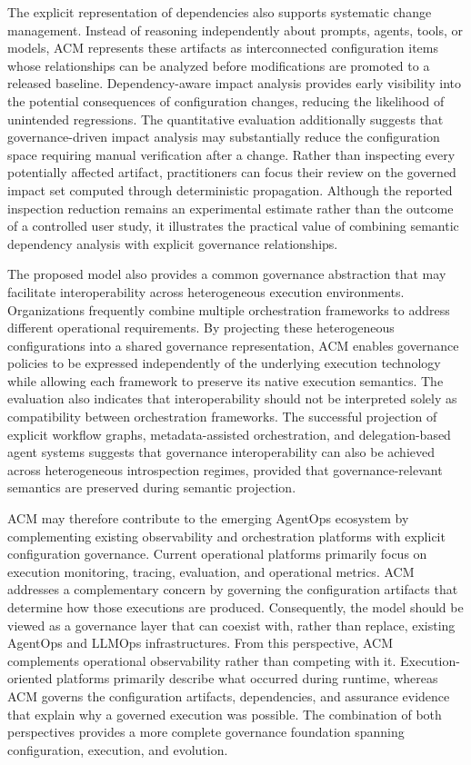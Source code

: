 \documentclass[10pt]{article}
\begin{document}
The explicit representation of dependencies also supports systematic change management. Instead of reasoning independently about prompts, agents, tools, or models, ACM represents these artifacts as interconnected configuration items whose relationships can be analyzed before modifications are promoted to a released baseline. Dependency-aware impact analysis provides early visibility into the potential consequences of configuration changes, reducing the likelihood of unintended regressions. The quantitative evaluation additionally suggests that governance-driven impact analysis may substantially reduce the configuration space requiring manual verification after a change. Rather than inspecting every potentially affected artifact, practitioners can focus their review on the governed impact set computed through deterministic propagation. Although the reported inspection reduction remains an experimental estimate rather than the outcome of a controlled user study, it illustrates the practical value of combining semantic dependency analysis with explicit governance relationships.


The proposed model also provides a common governance abstraction that may facilitate interoperability across heterogeneous execution environments. Organizations frequently combine multiple orchestration frameworks to address different operational requirements. By projecting these heterogeneous configurations into a shared governance representation, ACM enables governance policies to be expressed independently of the underlying execution technology while allowing each framework to preserve its native execution semantics. 
The evaluation also indicates that interoperability should not be interpreted solely as compatibility between orchestration frameworks. The successful projection of explicit workflow graphs, metadata-assisted orchestration, and delegation-based agent systems suggests that governance interoperability can also be achieved across heterogeneous introspection regimes, provided that governance-relevant semantics are preserved during semantic projection.

ACM may therefore contribute to the emerging AgentOps ecosystem by complementing existing observability and orchestration platforms with explicit configuration governance. Current operational platforms primarily focus on execution monitoring, tracing, evaluation, and operational metrics. ACM addresses a complementary concern by governing the configuration artifacts that determine how those executions are produced. Consequently, the model should be viewed as a governance layer that can coexist with, rather than replace, existing AgentOps and LLMOps infrastructures. 
From this perspective, ACM complements operational observability rather than competing with it. Execution-oriented platforms primarily describe what occurred during runtime, whereas ACM governs the configuration artifacts, dependencies, and assurance evidence that explain why a governed execution was possible. The combination of both perspectives provides a more complete governance foundation spanning configuration, execution, and evolution.
\end{document}
